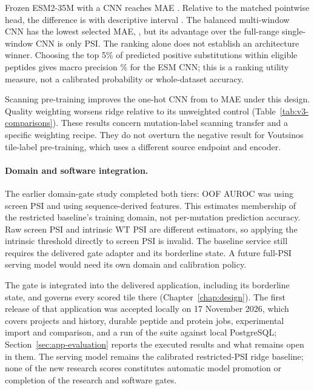Frozen ESM2-35M with a CNN reaches MAE \nVthreeCnnD{}. Relative to the matched pointwise head,
the difference is \nVthreeCnnDelta{} with descriptive interval \nVthreeCnnCI{}.
The balanced multi-window CNN has the lowest selected MAE, \nVthreeMcnnE{}, but its advantage
over the full-range single-window CNN is only \nVthreeMcnnGap{} PSI. The ranking alone does not
establish an architecture winner. Choosing the top 5\% of predicted positive substitutions within
eligible peptides gives macro precision \nVthreeCnnTopFive\% for the ESM CNN; this is a ranking
utility measure, not a calibrated probability or whole-dataset accuracy.

\begin{table}[htbp]
  \centering
  \caption[Paired full-PSI MAE differences]{Paired full-PSI MAE differences; negative values favour the first method. The two ridge
  range comparisons use 97.5\% intervals adjusted for two tests; the remaining intervals are
  descriptive 95\% intervals. All use 5,000 protein-group bootstrap resamples.}
  \label{tab:v3-comparisons}
  
\end{table}

Scanning pre-training improves the one-hot CNN from \nVthreeCnnScratch{} to
\nVthreeCnnTransfer{} MAE under this design. Quality weighting worsens ridge relative to its
unweighted control (Table~\ref{tab:v3-comparisons}). These results concern mutation-label scanning
transfer and a specific weighting recipe. They do not overturn the negative result for
Voutsinos tile-label pre-training, which uses a different source endpoint and encoder.



\paragraph{Domain and software integration.}\label{sec:res-domain}
The earlier domain-gate study completed both tiers: OOF AUROC was \nRthreeLookupAuc{} using
screen PSI and \nRthreeSequenceAuc{} using sequence-derived features. This estimates membership
of the restricted baseline's training domain, not per-mutation prediction accuracy. Raw screen PSI
and intrinsic WT PSI are different estimators, so applying the intrinsic threshold directly to
screen PSI is invalid. The baseline service still requires the delivered gate adapter and its
borderline state. A future full-PSI serving model would need its own domain and calibration policy.

The gate is integrated into the delivered application, including its borderline state, and governs
every scored tile there (Chapter~\ref{chap:design}). The first release of that application was
accepted locally on 17 November 2026, which covers projects and history, durable peptide and
protein jobs, experimental import and comparison, and a run of the suite against local PostgreSQL;
Section~\ref{sec:app-evaluation} reports the executed results and what remains open in them.
The serving model remains the calibrated restricted-PSI ridge baseline; none of the new research
scores constitutes automatic model promotion or completion of the research and software gates.
